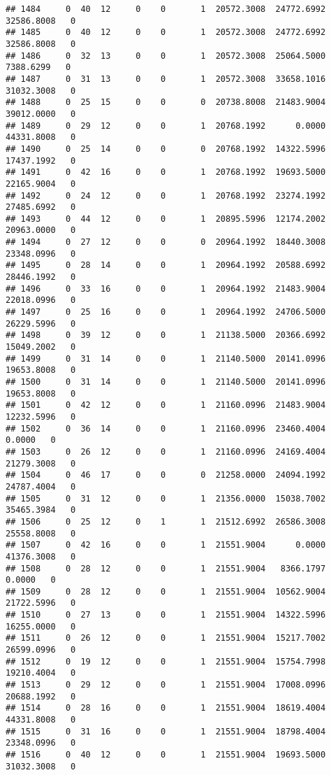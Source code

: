 \documentclass[
]{article}
\begin{document}
\begin{enumerate}
\begin{verbatim}
## 1484     0  40  12     0    0       1  20572.3008  24772.6992  32586.8008   0
## 1485     0  40  12     0    0       1  20572.3008  24772.6992  32586.8008   0
## 1486     0  32  13     0    0       1  20572.3008  25064.5000   7388.6299   0
## 1487     0  31  13     0    0       1  20572.3008  33658.1016  31032.3008   0
## 1488     0  25  15     0    0       0  20738.8008  21483.9004  39012.0000   0
## 1489     0  29  12     0    0       1  20768.1992      0.0000  44331.8008   0
## 1490     0  25  14     0    0       0  20768.1992  14322.5996  17437.1992   0
## 1491     0  42  16     0    0       1  20768.1992  19693.5000  22165.9004   0
## 1492     0  24  12     0    0       1  20768.1992  23274.1992  27485.6992   0
## 1493     0  44  12     0    0       1  20895.5996  12174.2002  20963.0000   0
## 1494     0  27  12     0    0       0  20964.1992  18440.3008  23348.0996   0
## 1495     0  28  14     0    0       1  20964.1992  20588.6992  28446.1992   0
## 1496     0  33  16     0    0       1  20964.1992  21483.9004  22018.0996   0
## 1497     0  25  16     0    0       1  20964.1992  24706.5000  26229.5996   0
## 1498     0  39  12     0    0       1  21138.5000  20366.6992  15049.2002   0
## 1499     0  31  14     0    0       1  21140.5000  20141.0996  19653.8008   0
## 1500     0  31  14     0    0       1  21140.5000  20141.0996  19653.8008   0
## 1501     0  42  12     0    0       1  21160.0996  21483.9004  12232.5996   0
## 1502     0  36  14     0    0       1  21160.0996  23460.4004      0.0000   0
## 1503     0  26  12     0    0       1  21160.0996  24169.4004  21279.3008   0
## 1504     0  46  17     0    0       0  21258.0000  24094.1992  24787.4004   0
## 1505     0  31  12     0    0       1  21356.0000  15038.7002  35465.3984   0
## 1506     0  25  12     0    1       1  21512.6992  26586.3008  25558.8008   0
## 1507     0  42  16     0    0       1  21551.9004      0.0000  41376.3008   0
## 1508     0  28  12     0    0       1  21551.9004   8366.1797      0.0000   0
## 1509     0  28  12     0    0       1  21551.9004  10562.9004  21722.5996   0
## 1510     0  27  13     0    0       1  21551.9004  14322.5996  16255.0000   0
## 1511     0  26  12     0    0       1  21551.9004  15217.7002  26599.0996   0
## 1512     0  19  12     0    0       1  21551.9004  15754.7998  19210.4004   0
## 1513     0  29  12     0    0       1  21551.9004  17008.0996  20688.1992   0
## 1514     0  28  16     0    0       1  21551.9004  18619.4004  44331.8008   0
## 1515     0  31  16     0    0       1  21551.9004  18798.4004  23348.0996   0
## 1516     0  40  12     0    0       1  21551.9004  19693.5000  31032.3008   0

\end{verbatim}
\end{enumerate}
\end{document}
